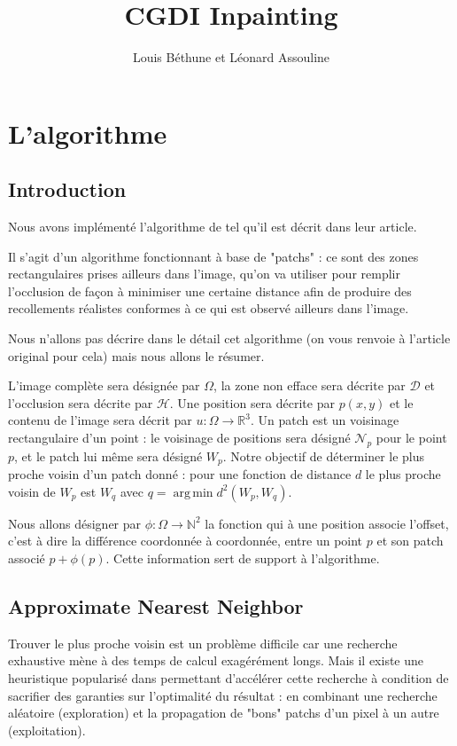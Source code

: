 \documentclass[a4paper, 10pt]{article}
\title{CGDI Inpainting}
\author{Louis Béthune et Léonard Assouline}
\date{}
\DeclareMathOperator*{\argmin}{arg\,min}
\begin{document}
\maketitle
\tableofcontents

\section{L'algorithme}

\subsection{Introduction}

Nous avons implémenté l'algorithme de \cite{newson2017non} tel qu'il est décrit dans leur article.  
  
Il s'agit d'un algorithme fonctionnant à base de "patchs" : ce sont des zones rectangulaires prises ailleurs dans l'image, qu'on va utiliser pour remplir l'occlusion de façon à minimiser une certaine distance afin de produire des recollements réalistes conformes à ce qui est observé ailleurs dans l'image.  
  
Nous n'allons pas décrire dans le détail cet algorithme (on vous renvoie à l'article original pour cela) mais nous allons le résumer.  

L'image complète sera désignée par $\Omega$, la zone non efface sera décrite par $\mathcal{D}$ et l'occlusion sera décrite par $\mathcal{H}$. Une position sera décrite par $p(x,y)$ et le contenu de l'image sera décrit par $u : \Omega\rightarrow \mathbb{R}^3$.  
Un patch est un voisinage rectangulaire d'un point : le voisinage de positions sera désigné $\mathcal{N}_p$ pour le point $p$, et le patch lui même sera désigné $W_p$.  
Notre objectif de déterminer le plus proche voisin d'un patch donné : pour une fonction de distance $d$ le plus proche voisin de $W_p$ est $W_q$ avec $q=\argmin d^2(W_p,W_q)$.  
    
Nous allons désigner par $\phi : \Omega \rightarrow \mathbb{N}^2$ la fonction qui à une position associe l'offset, c'est à dire la différence coordonnée à coordonnée, entre un point $p$ et son patch associé $p+\phi(p)$. Cette information sert de support à l'algorithme.  
  
\subsection{Approximate Nearest Neighbor}
  
Trouver le plus proche voisin est un problème difficile car une recherche exhaustive mène à des temps de calcul exagérément longs. Mais il existe une heuristique popularisé dans \cite{barnes2009patchmatch} permettant d'accélérer cette recherche à condition de sacrifier des garanties sur l'optimalité du résultat : en combinant une recherche aléatoire (exploration) et la propagation de "bons" patchs d'un pixel à un autre (exploitation).    
\end{document}
